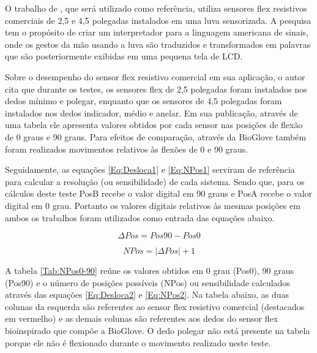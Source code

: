 \documentclass[
	12pt,				%
	openright,			%
	oneside,			%
	a4paper,			%
	english,			%
	brazil				%
	]{abntex2}
\begin{document}
	
		O trabalho de \cite{anbarasi2013deafmute}, que será utilizado como referência, utiliza sensores flex resistivos comerciais de 2,5 e 4,5 polegadas instalados em uma luva sensorizada. A pesquisa tem o propósito de criar um interpretador para a linguagem americana de sinais, onde os gestos da mão usando a luva são traduzidos e transformados em palavras que são posteriormente exibidas em uma pequena tela de LCD.

		Sobre o desempenho do sensor flex resistivo comercial em sua aplicação, o autor cita que durante os testes, os sensores flex de 2,5 polegadas foram instalados nos dedos mínimo e polegar, enquanto que os sensores de 4,5 polegadas foram instalados nos dedos indicador, médio e anelar. Em sua publicação, através de uma tabela ele apresenta valores obtidos por cada sensor nas posições de flexão de 0 graus e 90 graus. Para efeitos de comparação, através da BioGlove também foram realizados movimentos relativos às flexões de 0 e 90 graus. 
		
		Seguidamente, as equações \ref{Eq:Desloca1} e \ref{Eq:NPos1} serviram de referência para calcular a resolução (ou sensibilidade) de cada sistema. Sendo que, para os cálculos deste teste PosB recebe o valor digital em 90 graus e PosA recebe o valor digital em 0 grau. Portanto os valores digitais relativos às mesmas posições em ambos os trabalhos foram utilizados como entrada das equações abaixo. 
		
	\begin{equation}
			\Delta Pos 	= Pos 90 	- 	Pos 0
		\label{Eq:Desloca2}
	\end{equation}


	\begin{equation}
			NPos = |\Delta Pos| + 1
		\label{Eq:NPos2}
	\end{equation}


		A tabela \ref{Tab:NPos0-90} reúne os valores obtidos em 0 grau (Pos0), 90 graus (Pos90) e o número de posições possíveis (NPos) ou sensibilidade calculados através das equações \ref{Eq:Desloca2} e \ref{Eq:NPos2}. Na tabela abaixo, as duas colunas da esquerda são referentes ao sensor flex resistivo comercial (destacados em vermelho) e as demais colunas são referentes aos dedos do sensor flex bioinspirado que compõe a BioGlove. O dedo polegar não está presente na tabela porque ele não é flexionado durante o movimento realizado neste teste.
		
\end{document}

